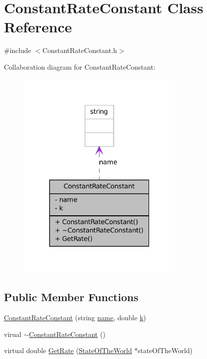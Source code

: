 \hypertarget{classConstantRateConstant}{
\section{ConstantRateConstant Class Reference}
\label{classConstantRateConstant}
}


{\ttfamily \#include $<$ConstantRateConstant.h$>$}



Collaboration diagram for ConstantRateConstant:\nopagebreak
\begin{figure}[H]
\begin{center}
\leavevmode
\includegraphics[width=232pt]{classConstantRateConstant__coll__graph}
\end{center}
\end{figure}
\subsection*{Public Member Functions}
\begin{DoxyCompactItemize}
\item 
\hyperlink{classConstantRateConstant_a733e712ecf33371ee2789b3f3f106d16}{ConstantRateConstant} (string \hyperlink{classConstantRateConstant_a303c84bba3e050f01322c05b55b34779}{name}, double \hyperlink{classConstantRateConstant_ac2963bcbd62887ad682c3f20464f5db1}{k})
\item 
virual \hyperlink{classConstantRateConstant_acf3c4ecdf09e328ea315eea945e1f2d4}{$\sim$ConstantRateConstant} ()
\item 
virtual double \hyperlink{classConstantRateConstant_ac74c67f5398dcaccda857b4417ea0ad3}{GetRate} (\hyperlink{classStateOfTheWorld}{StateOfTheWorld} $\ast$stateOfTheWorld)
\end{DoxyCompactItemize}
